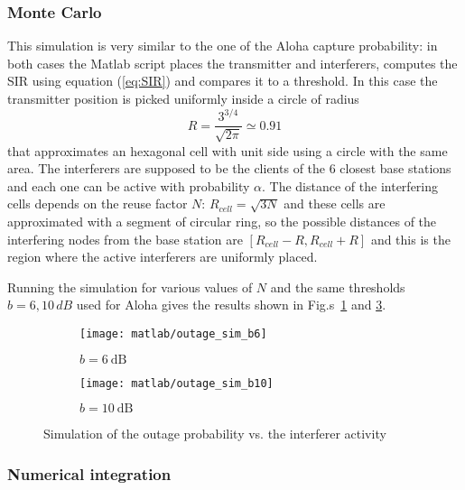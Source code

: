 \documentclass[a4paper,oneside]{article}
\renewcommand{\approx}[0]{\simeq}
\begin{document}
\subsubsection*{Monte Carlo}
This simulation is very similar to the one of the Aloha capture
probability: in both cases the Matlab script places the transmitter
and interferers, computes the SIR using equation (\ref{eq:SIR}) and compares it to
a threshold.
%
In this case the transmitter position is picked uniformly inside a
circle of radius
\begin{equation}
  R=\frac{3^{3/4}}{\sqrt{2\pi}} \approx 0.91
\end{equation}
that approximates an hexagonal cell with unit side using a circle with
the same area.  The interferers are supposed to be the clients of the
6 closest base stations and each one can be active with probability
$\alpha$. The distance of the interfering cells depends on the reuse
factor $N$: $R_{cell} = \sqrt{3N}$ and these cells are approximated
with a segment of circular ring, so the possible distances of the
interfering nodes from the base station are $[R_{cell} -R,
  R_{cell}+R]$ and this is the region where the active interferers are
uniformly placed.

Running the simulation for various values of $N$ and the same
thresholds $b= 6, 10 \, \si{dB}$ used for Aloha gives the results
shown in Fig.s~\ref{plot:outage_sim_b6} and \ref{plot:outage_sim_b10}.
\begin{figure}[htbp]
  \centering
  \begin{subfigure}{0.5\textwidth}
    \centering
    \texttt{[image: matlab/outage\_sim\_b6]}
    \caption{$ b = \SI{6}{\dB}$}
    \label{plot:outage_sim_b6}
  \end{subfigure}%
  \begin{subfigure}{0.5\textwidth}
    \centering
    \texttt{[image: matlab/outage\_sim\_b10]}
    \caption{$ b = \SI{10}{\dB}$}
    \label{plot:outage_sim_b10}
  \end{subfigure}
  \caption{Simulation of the outage probability vs. the interferer
    activity}
\end{figure}


\subsubsection*{Numerical integration}
\end{document}
